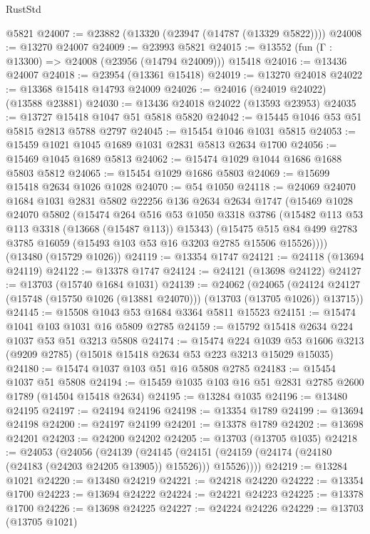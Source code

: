 \begin{lexlean}{RustStd}
\begin{coremodule}
    @5821
@24007 := @23882 (@13320 (@23947 (@14787 (@13329 @5822))))
@24008 := @13270 @24007
@24009 := @23993 @5821
@24015 := @13552 (fun (Γ : @13300) => @24008 (@23956 (@14794 @24009))) @15418
@24016 := @13436 @24007
@24018 := @23954 (@13361 @15418)
@24019 := @13270 @24018
@24022 := @13368 @15418 @14793 @24009
@24026 := @24016 (@24019 @24022) (@13588 @23881)
@24030 := @13436 @24018 @24022 (@13593 @23953)
@24035 := @13727 @15418 @1047 @51 @5818 @5820
@24042 := @15445 @1046 @53 @51 @5815 @2813 @5788 @2797
@24045 := @15454 @1046 @1031 @5815
@24053 := @15459 @1021 @1045 @1689 @1031 @2831 @5813 @2634 @1700
@24056 := @15469 @1045 @1689 @5813
@24062 := @15474 @1029 @1044 @1686 @1688 @5803 @5812
@24065 := @15454 @1029 @1686 @5803
@24069 := @15699 @15418 @2634 @1026 @1028
@24070 := @54 @1050
@24118 := @24069
    @24070
    @1684
    @1031
    @2831
    @5802
    @22256
    @136
    @2634
    @2634
    @1747
    (@15469
      @1028
      @24070
      @5802
      (@15474
        @264
        @516
        @53
        @1050
        @3318
        @3786
        (@15482 @113 @53 @113 @3318 (@13668 (@15487 @113)) @15343)
        (@15475 @515 @84 @499 @2783 @3785 @16059 (@15493 @103 @53 @16 @3203 @2785 @15506 @15526))))
    (@13480 (@15729 @1026))
@24119 := @13354 @1747
@24121 := @24118 (@13694 @24119)
@24122 := @13378 @1747
@24124 := @24121 (@13698 @24122)
@24127 := @13703 (@15740 @1684 @1031)
@24139 := @24062
    (@24065 (@24124 @24127 (@15748 (@15750 @1026 (@13881 @24070))) (@13703 (@13705 @1026)) @13715))
@24145 := @15508 @1043 @53 @1684 @3364 @5811 @15523
@24151 := @15474 @1041 @103 @1031 @16 @5809 @2785
@24159 := @15792 @15418 @2634 @224 @1037 @53 @51 @3213 @5808
@24174 := @15474
    @224
    @1039
    @53
    @1606
    @3213
    (@9209 @2785)
    (@15018 @15418 @2634 @53 @223 @3213 @15029 @15035)
@24180 := @15474 @1037 @103 @51 @16 @5808 @2785
@24183 := @15454 @1037 @51 @5808
@24194 := @15459 @1035 @103 @16 @51 @2831 @2785 @2600 @1789 (@14504 @15418 @2634)
@24195 := @13284 @1035
@24196 := @13480 @24195
@24197 := @24194 @24196
@24198 := @13354 @1789
@24199 := @13694 @24198
@24200 := @24197 @24199
@24201 := @13378 @1789
@24202 := @13698 @24201
@24203 := @24200 @24202
@24205 := @13703 (@13705 @1035)
@24218 := @24053
    (@24056
      (@24139
        (@24145 (@24151 (@24159 (@24174 (@24180 (@24183 (@24203 @24205 @13905)) @15526))) @15526))))
@24219 := @13284 @1021
@24220 := @13480 @24219
@24221 := @24218 @24220
@24222 := @13354 @1700
@24223 := @13694 @24222
@24224 := @24221 @24223
@24225 := @13378 @1700
@24226 := @13698 @24225
@24227 := @24224 @24226
@24229 := @13703 (@13705 @1021)

\end{coremodule}
\end{lexlean}
